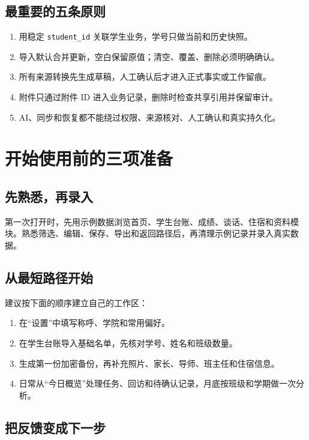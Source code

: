 \documentclass[UTF8,zihao=-4,oneside]{ctexrep}
\newcommand{\code}[1]{\texttt{\small #1}}
\begin{document}
\section{最重要的五条原则}

\begin{enumerate}
  \item 用稳定 \code{student\_id} 关联学生业务，学号只做当前和历史快照。
  \item 导入默认合并更新，空白保留原值；清空、覆盖、删除必须明确确认。
  \item 所有来源转换先生成草稿，人工确认后才进入正式事实或工作留痕。
  \item 附件只通过附件 ID 进入业务记录，删除时检查共享引用并保留审计。
  \item AI、同步和恢复都不能绕过权限、来源核对、人工确认和真实持久化。
\end{enumerate}

\chapter{开始使用前的三项准备}

\section{先熟悉，再录入}

第一次打开时，先用示例数据浏览首页、学生台账、成绩、谈话、住宿和资料模块。熟悉筛选、编辑、保存、导出和返回路径后，再清理示例记录并录入真实数据。

\section{从最短路径开始}

建议按下面的顺序建立自己的工作区：

\begin{enumerate}
  \item 在“设置”中填写称呼、学院和常用偏好。
  \item 在学生台账导入基础名单，先核对学号、姓名和班级数量。
  \item 生成第一份加密备份，再补充照片、家长、导师、班主任和住宿信息。
  \item 日常从“今日概览”处理任务、回访和待确认记录，月底按班级和学期做一次分析。
\end{enumerate}

\section{把反馈变成下一步}
\end{document}
